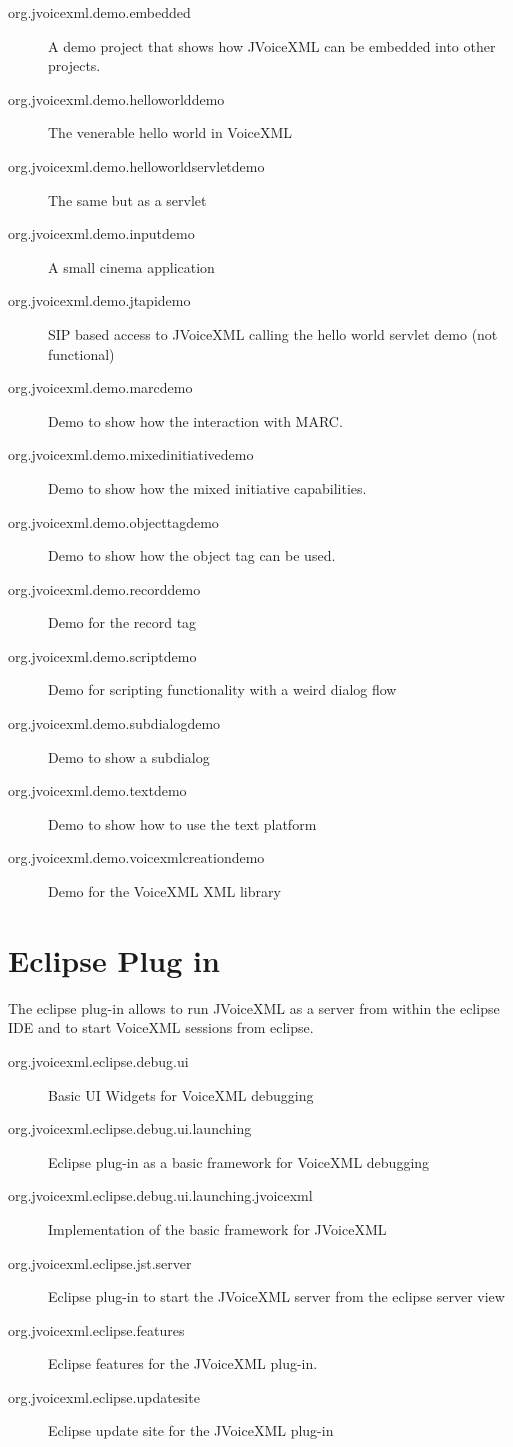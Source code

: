 \documentclass[11pt,a4paper]{article}
\begin{document}
\begin{description}
\item[org.jvoicexml.demo.embedded] A demo project that shows how JVoiceXML can
be embedded into other projects.
\item[org.jvoicexml.demo.helloworlddemo] The venerable hello world in Voice\-XML
\item[org.jvoicexml.demo.helloworldservletdemo] The same but as a servlet
\item[org.jvoicexml.demo.inputdemo] A small cinema application
\item[org.jvoicexml.demo.jtapidemo] SIP based access to JVoiceXML calling the
hello world servlet demo (not functional)
\item[org.jvoicexml.demo.marcdemo] Demo to show how the interaction with MARC.
\item[org.jvoicexml.demo.mixedinitiativedemo] Demo to show how the mix\-ed
initiative capabilities.
\item[org.jvoicexml.demo.objecttagdemo] Demo to show how the object tag can be
used.
\item[org.jvoicexml.demo.recorddemo] Demo for the record tag
\item[org.jvoicexml.demo.scriptdemo] Demo for scripting functionality with a
weird dialog flow
\item[org.jvoicexml.demo.subdialogdemo] Demo to show a subdialog
\item[org.jvoicexml.demo.textdemo] Demo to show how to use the text platform
\item[org.jvoicexml.demo.voicexmlcreationdemo] Demo for the VoiceXML XML library
\end{description}

\section{Eclipse Plug in}

The eclipse plug-in allows to run JVoiceXML as a server from within the eclipse
IDE and to start VoiceXML sessions from eclipse.

\begin{description}
\item[org.jvoicexml.eclipse.debug.ui] Basic UI Widgets for VoiceXML debugging
\item[org.jvoicexml.eclipse.debug.ui.launching] Eclipse plug-in as a basic
framework for VoiceXML debugging
\item[org.jvoicexml.eclipse.debug.ui.launching.jvoicexml] Implementation of the
basic framework for JVoiceXML
\item[org.jvoicexml.eclipse.jst.server] Eclipse plug-in to start the JVoiceXML
server from the eclipse server view
\item[org.jvoicexml.eclipse.features] Eclipse features for the JVoiceXML
plug-in.
\item[org.jvoicexml.eclipse.updatesite] Eclipse update site for the
JVoiceXML plug-in
\end{description}
\end{document}
